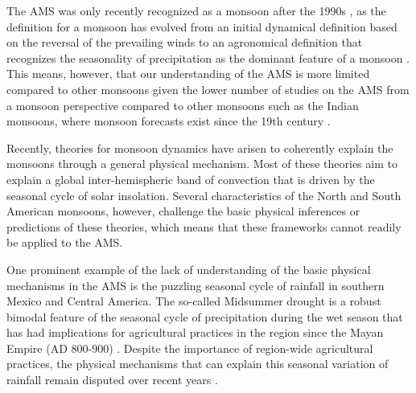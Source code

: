 The AMS was only recently recognized as a monsoon after the 1990s , as the definition for a monsoon has evolved from an initial dynamical definition based on the reversal of the prevailing winds to an agronomical definition that recognizes the seasonality of precipitation as the dominant feature of a monsoon \citep{wang2017,gadgil2018}. This  means, however, that our understanding of the AMS is more limited compared to other monsoons given the lower number of studies on the AMS from a monsoon perspective compared to other monsoons such as the Indian monsoons, where monsoon forecasts exist since the 19th century \citep{blanford}.


Recently, theories for monsoon dynamics \citep{bordoni2008monsoons,biasutti2018global,hill2019,geen2020} have arisen to coherently explain the monsoons through a general physical mechanism. Most of these theories aim to explain a global inter-hemispheric band of convection that is driven by the seasonal cycle of solar insolation. Several characteristics of the North and South American monsoons, however, challenge the basic physical inferences or predictions of these theories, which means that these frameworks cannot readily  be applied to the AMS.


One prominent example of the lack of understanding of the basic physical mechanisms in the AMS is the puzzling seasonal cycle of rainfall in southern Mexico and Central America. The so-called Midsummer drought is a robust bimodal feature of the seasonal cycle of precipitation during the wet season that has had implications for agricultural practices in the region since the Mayan Empire (AD 800-900) \citep{jobbova2018ritual}. Despite the importance of region-wide agricultural practices, the physical mechanisms that can explain this seasonal variation of rainfall remain disputed over recent years \citep{karnauskas2013,herrera2015,zermeno2019}. 



